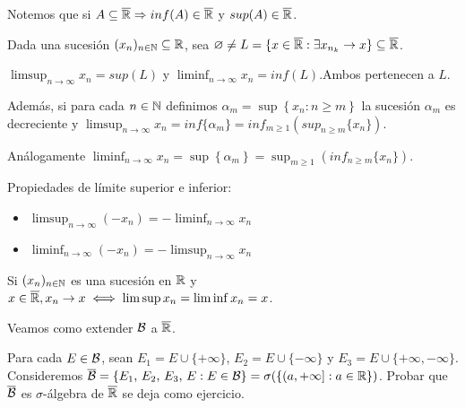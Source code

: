 Notemos que si $A \subseteq \overline{\mathbb{R}} \Rightarrow inf(A) \in \overline{\mathbb{R}}$ y $sup(A) \in \overline{\mathbb{R}}$.

Dada una sucesión $(x_n)_{n \in \mathbb{N}} \subseteq \mathbb{R}$, sea $\varnothing \neq L = \{ x \in \overline{\mathbb{R}} : \exists x_{n_k} \to x \} \subseteq \overline{\mathbb{R}}$.

\begin{definition}
    $\limsup_{n \to \infty} x_n = sup(L)$ y $\liminf_{n \to \infty} x_n = inf(L)$.Ambos pertenecen a $L$.

    Además, si para cada $n \in \mathbb{N}$ definimos $\alpha_m = \sup \left\{ x_n : n \geq m \right\}$ la sucesión $\alpha_m$ es decreciente y
    $\limsup_{n \to \infty} x_n = inf\{\alpha_m\} = inf_{m \geq 1} ( sup_{n \geq m}\{x_n\} )$.

    Análogamente $\liminf_{n \to \infty} x_n = \sup\left\{\alpha_m\right\} = \sup_{m \geq 1} ( inf_{n \geq m}\{x_n\} )$.
\end{definition}

\begin{prop}
    Propiedades de límite superior e inferior:
    \begin{itemize}
        \item $\limsup_{n \to \infty} (- x_n) = - \liminf_{n \to \infty} x_n$
        \item $\liminf_{n \to \infty} (- x_n) = - \limsup_{n \to \infty} x_n$
    \end{itemize}
\end{prop}

\begin{note}
    Si $(x_n)_{n \in \mathbb{N}}$ es una sucesión en $\mathbb{R}$ y $x \in \overline{\mathbb{R}}, x_n \to x \iff \limsup x_n = \liminf x_n = x$.
\end{note}

Veamos como extender $\mathcal{B}$ a $\overline{\mathbb{R}}$.

\begin{definition}
    Para cada $E \in \mathcal{B}$, sean $E_1 = E \cup \{ + \infty \}$, $E_2 = E \cup \{ - \infty \}$ y $E_3 = E \cup \{ + \infty, - \infty \}$.
    Consideremos $\overline{\mathcal{B}} = \{ E_1 \text{, } E_2 \text{, } E_3 \text{, } E : E \in \mathcal{B} \} = \sigma(\{ (a, +\infty] : a \in \mathbb{R} \})$.
    Probar que $\overline{\mathcal{B}}$ es $\sigma$-álgebra de $\overline{\mathbb{R}}$ se deja como ejercicio.
\end{definition}

